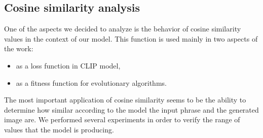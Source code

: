 \documentclass[12pt,a4paper,openany]{book}
\begin{document}
\subsection*{Cosine similarity analysis}
\noindent One of the aspects we decided to analyze is the behavior of cosine similarity values in the context of our model. This function is used mainly in two aspects of the work:
\begin{itemize}
\item  as a loss function in CLIP model,
\item as a fitness function for evolutionary algorithms.
\end{itemize}
\noindent The most important application of cosine similarity seems to be the ability to determine how similar according to the model the input phrase and the generated image are.  We performed several experiments in order to verify the range of values that the model is producing.
\end{document}
